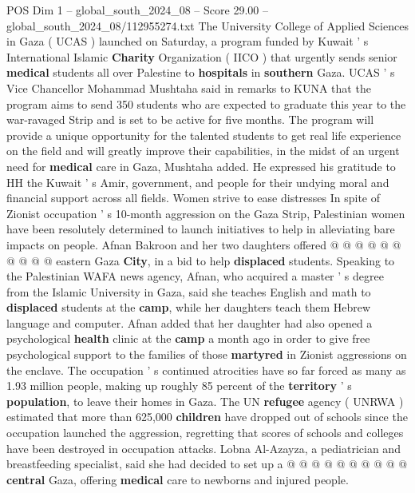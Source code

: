 \begin{textsample}{POS Dim 1 – global\_south\_2024\_08 – Score 29.00 – global\_south\_2024\_08/112955274.txt}  \label{ex:f1_pos_324}
The University College of Applied Sciences in Gaza ( UCAS ) launched on Saturday, a program funded by Kuwait ' s International Islamic \textbf{Charity} Organization ( IICO ) that urgently sends senior \textbf{medical} students all over Palestine to \textbf{hospitals} in \textbf{southern} Gaza.
UCAS ' s Vice Chancellor Mohammad Mushtaha said in remarks to KUNA that the program aims to send 350 students who are expected to graduate this year to the war-ravaged Strip and is set to be active for five months.
The program will provide a unique opportunity for the talented students to get real life experience on the field and will greatly improve their capabilities, in the midst of an urgent need for \textbf{medical} care in Gaza, Mushtaha added.
He expressed his gratitude to HH the Kuwait ' s Amir, government, and people for their undying moral and financial support across all fields.
Women strive to ease distresses In spite of Zionist occupation ' s 10-month aggression on the Gaza Strip, Palestinian women have been resolutely determined to launch initiatives to help in alleviating bare impacts on people.
Afnan Bakroon and her two daughters offered @ @ @ @ @ @ @ @ @ @ eastern Gaza \textbf{City}, in a bid to help \textbf{displaced} students.
Speaking to the Palestinian WAFA news agency, Afnan, who acquired a master ' s degree from the Islamic University in Gaza, said she teaches English and math to \textbf{displaced} students at the \textbf{camp}, while her daughters teach them Hebrew language and computer.
Afnan added that her daughter had also opened a psychological \textbf{health} clinic at the \textbf{camp} a month ago in order to give free psychological support to the families of those \textbf{martyred} in Zionist aggressions on the enclave.
The occupation ' s continued atrocities have so far forced as many as 1.93 million people, making up roughly 85 percent of the \textbf{territory} ' s \textbf{population}, to leave their homes in Gaza.
The UN \textbf{refugee} agency ( UNRWA ) estimated that more than 625,000 \textbf{children} have dropped out of schools since the occupation launched the aggression, regretting that scores of schools and colleges have been destroyed in occupation attacks.
Lobna Al-Azayza, a pediatrician and breastfeeding specialist, said she had decided to set up a @ @ @ @ @ @ @ @ @ @ \textbf{central} Gaza, offering \textbf{medical} care to newborns and injured people.

\end{textsample}
